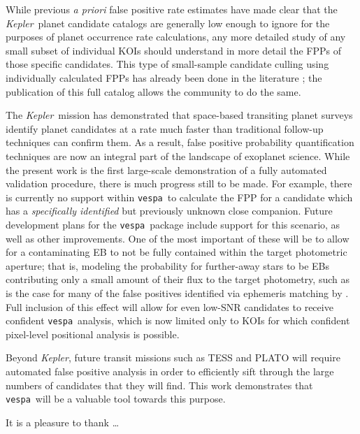 \documentclass{emulateapj}
\newcommand{\kepler}{\textit{Kepler}}
\newcommand{\vespa}{\texttt{vespa}}
\begin{document}
While previous \emph{a priori} false positive rate estimates
\cite{Morton:2011b,Fressin:2013} have made clear that the
\kepler\ planet candidate catalogs are generally low enough to
ignore for the purposes of planet occurrence rate calculations, any
more detailed study of any small subset of individual KOIs should
understand in more detail the FPPs of those specific candidates.  This
type of small-sample candidate culling using individually calculated
FPPs has already been done in the literature
\citep{MortonSwift:2014,MortonWinn:2015}; the publication of this full
catalog allows the community to do the same.

The \kepler\ mission has demonstrated that space-based transiting
planet surveys identify planet candidates at a rate much faster than
traditional follow-up techniques can confirm them.  As a result, false
positive probability quantification techniques are now an integral
part of the landscape of exoplanet science.  While the present work is
the first large-scale demonstration of a fully automated validation
procedure, there is much progress still to be made.  For example,
there is currently no support within \vespa\ to calculate the FPP for
a candidate which has a \emph{specifically identified} but previously
unknown close companion.  Future development plans for the
\vespa\ package include support for this scenario, as well as other
improvements.  One of the most important of these will be to allow for
a contaminating EB to not be fully contained within the target
photometric aperture; that is, modeling the probability for
further-away stars to be EBs contributing only a small amount of their
flux to the target photometry, such as is the case for many of the
false positives identified via ephemeris matching by
\citet{Coughlin:2014}.  Full inclusion of this effect will allow for
even low-SNR candidates to receive confident \vespa\ analysis, which
is now limited only to KOIs for which confident pixel-level positional
analysis is possible.

Beyond \kepler, future transit missions such as TESS and PLATO will
require automated false positive analysis in order to efficiently sift
through the large numbers of candidates that they will find.  This
work demonstrates that \vespa\ will be a valuable tool towards this
purpose.



\acknowledgments
It is a pleasure to thank
\ldots\

\clearpage

\clearpage
\end{document}
